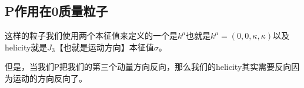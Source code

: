 \subsection{P作用在0质量粒子}
这样的粒子我们使用两个本征值来定义的一个是$ k^\mu $也就是$ k^\mu = (0,0,\kappa,\kappa) $以及helicity就是$ J_3 $【也就是运动方向】本征值$ \sigma $。   

但是，当我们$ \mathsf{P} $把我们的第三个动量方向反向，那么我们的helicity其实需要反向因为运动的方向反向了。


















































